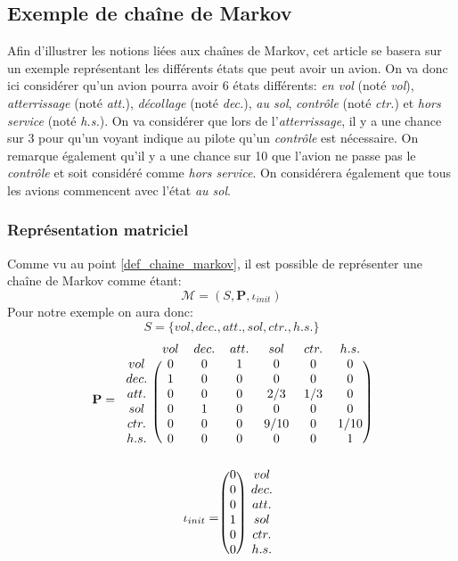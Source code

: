 \documentclass[letterpaper]{article}
\begin{document}
  \subsection{Exemple de chaîne de Markov}
    \label{exemple}
    Afin d'illustrer les notions liées aux chaînes de Markov, cet article se
    basera sur un exemple représentant les différents états que peut avoir
    un avion.  On va donc ici considérer qu'un avion pourra avoir 6 états
    différents: \textit{en vol} (noté \textit{vol}), \textit{atterrissage}
    (noté \textit{att.}), \textit{décollage} (noté \textit{dec.}),
    \textit{au sol}, \textit{contrôle} (noté \textit{ctr.})
    et \textit{hors service} (noté \textit{h.s.}).
    On va considérer que lors de l'\textit{atterrissage}, il y a une chance sur
    3 pour qu'un voyant indique au pilote qu'un \textit{contrôle} est
    nécessaire. On remarque également qu'il y a une chance sur 10 que
    l'avion ne passe pas le \textit{contrôle} et soit considéré comme
    \textit{hors service}.  On considérera également que tous les avions commencent
    avec l'état \textit{au sol}.

    \subsubsection{Représentation matriciel}
      Comme vu au point \ref{def_chaine_markov}, il est possible de représenter une
      chaîne de Markov comme étant:
      $$\mathcal{M} = (S, \mathbf{P}, \iota_{init})$$
      Pour notre exemple on aura donc:
      $$S = \{vol, dec., att., sol, ctr., h.s.\} $$
      $$ \mathbf{P} =
	\begin{blockarray}{ccccccc}
	& vol & dec. & att. & sol & ctr. & h.s. \\
	  \begin{block}{c(cccccc)}
	    vol  & 0 & 0 & 1 & 0    & 0   & 0    \\
	    dec. & 1 & 0 & 0 & 0    & 0   & 0    \\
	    att. & 0 & 0 & 0 & 2/3  & 1/3 & 0    \\
	    sol  & 0 & 1 & 0 & 0    & 0   & 0    \\
	    ctr. & 0 & 0 & 0 & 9/10 & 0   & 1/10 \\
	    h.s. & 0 & 0 & 0 & 0    & 0   & 1    \\
	  \end{block}
	\end{blockarray}
      $$
      $$\iota_{init} =
	\begin{blockarray}{cc}
	  \begin{block}{( c ) c}
	    0 & vol \\
	    0 & dec.\\
	    0 & att.\\
	    1 & sol\\
	    0 & ctr.\\
	    0 & h.s.\\
	  \end{block}
	\end{blockarray}
      $$
\end{document}
